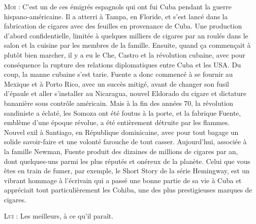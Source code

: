 \begin{dialogue}
\textsc{Moi} : C’est un de ces émigrés espagnols qui ont fui Cuba pendant la guerre hispano-américaine. Il a atterri à Tampa, en Floride, et s’est lancé dans la fabrication de cigares avec des feuilles en provenance de Cuba. Une production d’abord confidentielle, limitée à quelques milliers de cigares par an roulés dans le salon et la cuisine par les membres de la famille. Ensuite, quand ça commençait à plutôt bien marcher, il y a eu le Che, Castro et la révolution cubaine, avec pour conséquence la rupture des relations diplomatiques entre Cuba et les USA. Du coup, la manne cubaine s’est tarie. Fuente a donc commencé à se fournir au Mexique et à Porto Rico, avec un succès mitigé, avant de changer son fusil d’épaule et aller s’installer au Nicaragua, nouvel Eldorado du cigare et dictature bananière sous contrôle américain. Mais à la fin des années 70, la révolution sandiniste a éclaté, les Somoza ont été foutus à la porte, et la fabrique Fuente, emblème d’une époque révolue, a été entièrement détruite par les flammes. Nouvel exil à Santiago, en République dominicaine, avec pour tout bagage un solide savoir-faire et une volonté farouche de tout casser. Aujourd’hui, associée à la famille Newman, Fuente produit des dizaines de millions de cigares par an, dont quelques-uns parmi les plus réputés et onéreux de la planète. Celui que vous êtes en train de fumer, par exemple, le Short Story de la série Hemingway, est un vibrant hommage à l’écrivain qui a passé une bonne partie de sa vie à Cuba et appréciait tout particulièrement les Cohiba, une des plus prestigieuses marques de cigares.

\textsc{Lui} : Les meilleurs, à ce qu’il paraît.


\end{dialogue}
